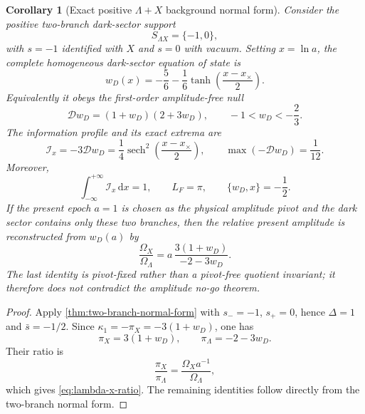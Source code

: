 \documentclass[aps,prd,preprint,onecolumn,nofootinbib,superscriptaddress,showkeys]{revtex4-2}
\numberwithin{equation}{section}
\theoremstyle{definition}
\theoremstyle{plain}
\newtheorem{corollary}{Corollary}[section]
\newcommand{\dd}{\mathrm d}
\newcommand{\Dil}{\mathscr D}
\begin{document}
\begin{corollary}[Exact positive $\Lambda+X$ background normal form]\label{cor:lambda-x-normal-form}
Consider the positive two-branch dark-sector support
\[
S_{\Lambda X}=\{-1,0\},
\]
with $s=-1$ identified with $X$ and $s=0$ with vacuum.  Setting $x=\ln a$, the complete homogeneous dark-sector equation of state is
\begin{equation}
\boxed{
w_D(x)=-\frac56-\frac16\tanh\!\left(\frac{x-x_\times}{2}\right).
}
\end{equation}
Equivalently it obeys the first-order amplitude-free null
\begin{equation}
\boxed{
\Dil w_D=(1+w_D)(2+3w_D),
\qquad -1<w_D<-\frac23.
}
\end{equation}
The information profile and its exact extrema are
\begin{equation}
\boxed{
\mathcal I_x=-3\Dil w_D
=\frac14\operatorname{sech}^2\!\left(\frac{x-x_\times}{2}\right),
\qquad
\max(-\Dil w_D)=\frac1{12}.
}
\end{equation}
Moreover,
\begin{equation}
\boxed{
\int_{-\infty}^{+\infty}\mathcal I_x\,\dd x=1,
\qquad
L_F=\pi,
\qquad
\{w_D,x\}=-\frac12.
}
\end{equation}
If the present epoch $a=1$ is chosen as the physical amplitude pivot and the dark sector contains only these two branches, then the relative present amplitude is reconstructed from $w_D(a)$ by
\begin{equation}
\boxed{
\frac{\Omega_X}{\Omega_\Lambda}
=a\,\frac{3(1+w_D)}{-2-3w_D}.
}
\label{eq:lambda-x-ratio}
\end{equation}
The last identity is pivot-fixed rather than a pivot-free quotient invariant; it therefore does not contradict the amplitude no-go theorem.
\end{corollary}

\begin{proof}
Apply \cref{thm:two-branch-normal-form} with $s_-=-1$, $s_+=0$, hence $\Delta=1$ and $\bar s=-1/2$.  Since $\kappa_1=-\pi_X=-3(1+w_D)$, one has
\[
\pi_X=3(1+w_D),
\qquad
\pi_\Lambda=-2-3w_D.
\]
Their ratio is
\[
\frac{\pi_X}{\pi_\Lambda}
=\frac{\Omega_Xa^{-1}}{\Omega_\Lambda},
\]
which gives \cref{eq:lambda-x-ratio}.  The remaining identities follow directly from the two-branch normal form.
\end{proof}
\end{document}
